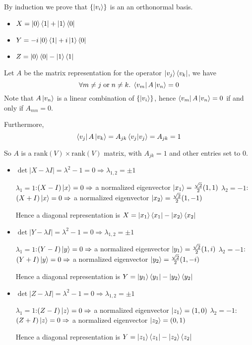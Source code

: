 \documentclass{homeworg}
\begin{document}
By induction we prove that $\{\ket{v_i}\}$ is an an orthonormal basis.

\exercise*
\begin{itemize}
    \item $X=\ket{0}\bra{1}+\ket{1}\bra{0}$
    \item $Y=-i\ket{0}\bra{1}+i\ket{1}\bra{0}$
    \item $Z=\ket{0}\bra{0}-\ket{1}\bra{1}$
\end{itemize}

\exercise*
Let $A$ be the matrix representation for the operator $\ket{v_j}\bra{v_k}$, we have
\[\forall m\neq j\;\text{or}\;n\neq k.\;\bra{v_m}A\ket{v_n}=0\]
Note that $A\ket{v_n}$ is a linear combination of $\{\ket{v_i}\}$, hence $\bra{v_m}A\ket{v_n}=0$ if and only if $A_{mn}=0$.

Furthermore,
\[\bra{v_j}A\ket{v_k}=A_{jk}\braket{v_j|v_j}=A_{jk}=1\]

So $A$ is a $\text{rank}(V)\times \text{rank}(V)$ matrix, with $A_{jk}=1$ and other entries set to 0.

\exercise*
\begin{itemize}
    \item $\det|X-\lambda I|=\lambda^2-1=0\Rightarrow\lambda_{1,2}=\pm1$
    
        \subitem $\lambda_1=1$:\quad$(X-I)\ket{x}=0\Rightarrow$ a normalized eigenvector $\ket{x_1}=\frac{\sqrt{2}}{2}(1,1)$
        \subitem $\lambda_2=-1$:\;\;$(X+I)\ket{x}=0\Rightarrow$ a normalized eigenvector $\ket{x_2}=\frac{\sqrt{2}}{2}(1,-1)$
        
    Hence a diagonal representation is $X=\ket{x_1}\bra{x_1} - \ket{x_2}\bra{x_2}$
    \item $\det|Y-\lambda I|=\lambda^2-1=0\Rightarrow\lambda_{1,2}=\pm 1$
    
        \subitem $\lambda_1=1$:\quad$(Y-I)\ket{y}=0\Rightarrow$ a normalized eigenvector $\ket{y_1}=\frac{\sqrt{2}}{2}(1,i)$
        \subitem $\lambda_2=-1$:\;\;$(Y+I)\ket{y}=0\Rightarrow$ a normalized eigenvector $\ket{y_2}=\frac{\sqrt{2}}{2}(1,-i)$
        
    Hence a diagonal representation is $Y=\ket{y_1}\bra{y_1} - \ket{y_2}\bra{y_2}$
    \item $\det|Z-\lambda I|=\lambda^2-1=0\Rightarrow\lambda_{1,2}=\pm 1$
    
        \subitem $\lambda_1=1$:\quad$(Z-I)\ket{z}=0\Rightarrow$ a normalized eigenvector $\ket{z_1}=(1,0)$
        \subitem $\lambda_2=-1$:\;\;$(Z+I)\ket{z}=0\Rightarrow$ a normalized eigenvector $\ket{z_2}=(0,1)$
        
    Hence a diagonal representation is $Y=\ket{z_1}\bra{z_1} - \ket{z_2}\bra{z_2}$
\end{itemize}
\end{document}
